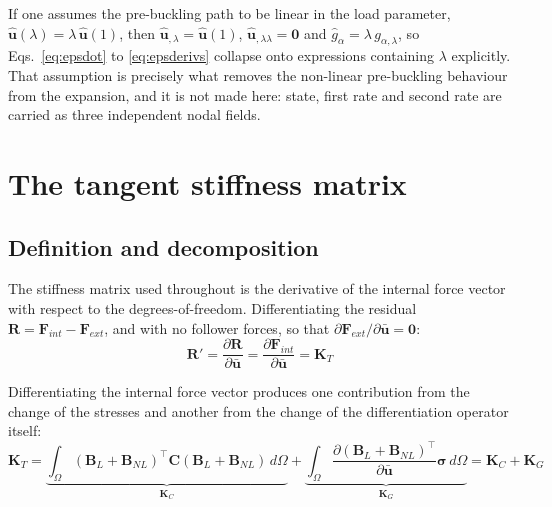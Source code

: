 \documentclass[11pt,a4paper]{article}
\begin{document}
If one assumes the pre-buckling path to be linear in the load parameter,
$\boldsymbol{\hat{u}}(\lambda) = \lambda\,\boldsymbol{\hat{u}}(1)$, then
$\boldsymbol{\hat{u}}_{,\lambda} = \boldsymbol{\hat{u}}(1)$,
$\boldsymbol{\hat{u}}_{,\lambda\lambda} = \boldsymbol{0}$ and $\hat{g}_\alpha =
\lambda\,g_{\alpha,\lambda}$, so Eqs.~\ref{eq:epsdot} to \ref{eq:epsderivs}
collapse onto expressions containing $\lambda$ explicitly.  That assumption is
precisely what removes the non-linear pre-buckling behaviour from the
expansion, and it is not made here: state, first rate and second rate are
carried as three independent nodal fields.

\section{The tangent stiffness matrix}
\label{sec:tangent}

\subsection{Definition and decomposition}

The stiffness matrix used throughout is the derivative of the internal force
vector with respect to the degrees-of-freedom.  Differentiating the residual
$\boldsymbol{R} = \boldsymbol{F}_{int} - \boldsymbol{F}_{ext}$, and with no
follower forces, so that $\partial\boldsymbol{F}_{ext}/
\partial\boldsymbol{\bar{u}} = \boldsymbol{0}$:
\begin{equation}\label{eq:tangent-definition}
	\boldsymbol{R}' = \frac{\partial \boldsymbol{R}}{\partial \boldsymbol{\bar{u}}}
	= \frac{\partial \boldsymbol{F}_{int}}{\partial \boldsymbol{\bar{u}}}
	= \boldsymbol{K}_T
\end{equation}

Differentiating the internal force vector produces one contribution from the
change of the stresses and another from the change of the differentiation
operator itself:
\begin{equation}\label{eq:tangent-decomposition}
	\boldsymbol{K}_T
	= \underbrace{\int_{\Omega} (\boldsymbol{B}_L + \boldsymbol{B}_{NL})^\top
	  \boldsymbol{C} (\boldsymbol{B}_L + \boldsymbol{B}_{NL})
	  \, d\Omega}_{\boldsymbol{K}_C}
	+ \underbrace{\int_{\Omega}
	  \frac{\partial (\boldsymbol{B}_L + \boldsymbol{B}_{NL})^\top}
	       {\partial \boldsymbol{\bar{u}}}
	  \boldsymbol{\sigma} \, d\Omega}_{\boldsymbol{K}_G}
	= \boldsymbol{K}_C + \boldsymbol{K}_G
\end{equation}
\end{document}
